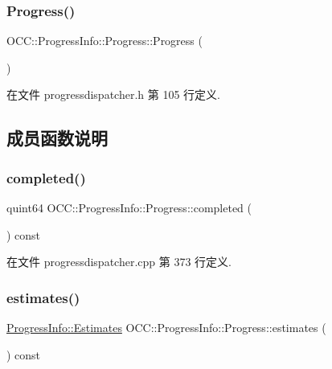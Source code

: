 \subsubsection{\texorpdfstring{Progress()}{Progress()}}
{\footnotesize\ttfamily O\+C\+C\+::\+Progress\+Info\+::\+Progress\+::\+Progress (\begin{DoxyParamCaption}{ }\end{DoxyParamCaption})}



在文件 progressdispatcher.\+h 第 105 行定义.



\subsection{成员函数说明}
\mbox{\label{struct_o_c_c_1_1_progress_info_1_1_progress_a9565761ed6d6f5d0aa3e7860860add9a}} 
\subsubsection{\texorpdfstring{completed()}{completed()}}
{\footnotesize\ttfamily quint64 O\+C\+C\+::\+Progress\+Info\+::\+Progress\+::completed (\begin{DoxyParamCaption}{ }\end{DoxyParamCaption}) const}



在文件 progressdispatcher.\+cpp 第 373 行定义.

\mbox{\label{struct_o_c_c_1_1_progress_info_1_1_progress_af08d5c60250a1db3c81bcd7cc87b8302}} 
\subsubsection{\texorpdfstring{estimates()}{estimates()}}
{\footnotesize\ttfamily \hyperlink{struct_o_c_c_1_1_progress_info_1_1_estimates}{Progress\+Info\+::\+Estimates} O\+C\+C\+::\+Progress\+Info\+::\+Progress\+::estimates (\begin{DoxyParamCaption}{ }\end{DoxyParamCaption}) const}

